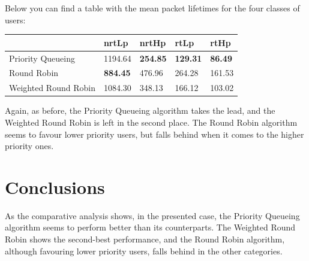 \documentclass[12pt]{article}
\begin{document}
        Below you can find a table with the mean packet lifetimes for the four classes of users:
        \begin{table}[htbp!]
            \centering
            \begin{tabular}{l|l|l|l|l|}
                \cline{2-5}
                                                        & nrtLp           & nrtHp           & rtLp            & rtHp           \\ \hline
                \multicolumn{1}{|l|}{Priority Queueing}    & 1194.64         & \textbf{254.85} & \textbf{129.31} & \textbf{86.49} \\ \hline
                \multicolumn{1}{|l|}{Round Robin}          & \textbf{884.45} & 476.96          & 264.28          & 161.53         \\ \hline
                \multicolumn{1}{|l|}{Weighted Round Robin} & 1084.30         & 348.13          & 166.12          & 103.02         \\ \hline
                \end{tabular}
        \end{table}

        Again, as before, the Priority Queueing algorithm takes the lead, and the Weighted Round Robin is left in the second place. The Round Robin algorithm seems to favour lower priority users, but falls behind when it comes to the higher priority ones.

    \section{Conclusions}
    As the comparative analysis shows, in the presented case, the Priority Queueing algorithm seems to perform better than its counterparts. The Weighted Round Robin shows the second-best performance, and the Round Robin algorithm, although favouring lower priority users, falls behind in the other categories.
\end{document}
